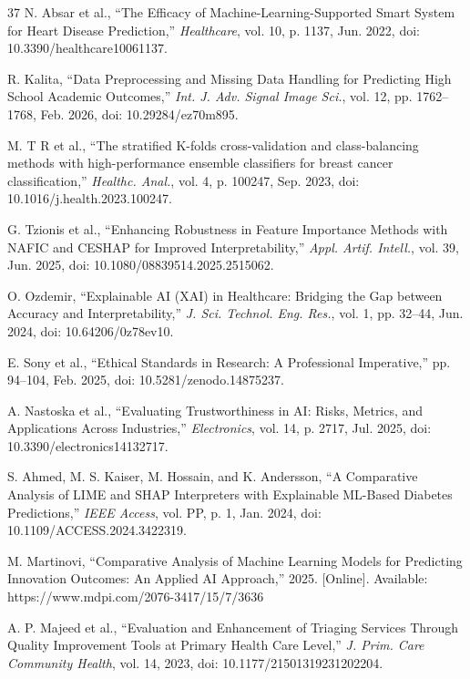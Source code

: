 \documentclass[conference]{IEEEtran}
\begin{document}
\begin{thebibliography}{37}
N. Absar et al., ``The Efficacy of Machine-Learning-Supported Smart System for Heart Disease Prediction,'' \textit{Healthcare}, vol. 10, p. 1137, Jun. 2022, doi: 10.3390/healthcare10061137.

R. Kalita, ``Data Preprocessing and Missing Data Handling for Predicting High School Academic Outcomes,'' \textit{Int. J. Adv. Signal Image Sci.}, vol. 12, pp. 1762--1768, Feb. 2026, doi: 10.29284/ez70m895.

M. T R et al., ``The stratified K-folds cross-validation and class-balancing methods with high-performance ensemble classifiers for breast cancer classification,'' \textit{Healthc. Anal.}, vol. 4, p. 100247, Sep. 2023, doi: 10.1016/j.health.2023.100247.

G. Tzionis et al., ``Enhancing Robustness in Feature Importance Methods with NAFIC and CESHAP for Improved Interpretability,'' \textit{Appl. Artif. Intell.}, vol. 39, Jun. 2025, doi: 10.1080/08839514.2025.2515062.

O. Ozdemir, ``Explainable AI (XAI) in Healthcare: Bridging the Gap between Accuracy and Interpretability,'' \textit{J. Sci. Technol. Eng. Res.}, vol. 1, pp. 32--44, Jun. 2024, doi: 10.64206/0z78ev10.

E. Sony et al., ``Ethical Standards in Research: A Professional Imperative,'' pp. 94--104, Feb. 2025, doi: 10.5281/zenodo.14875237.

A. Nastoska et al., ``Evaluating Trustworthiness in AI: Risks, Metrics, and Applications Across Industries,'' \textit{Electronics}, vol. 14, p. 2717, Jul. 2025, doi: 10.3390/electronics14132717.

S. Ahmed, M. S. Kaiser, M. Hossain, and K. Andersson, ``A Comparative Analysis of LIME and SHAP Interpreters with Explainable ML-Based Diabetes Predictions,'' \textit{IEEE Access}, vol. PP, p. 1, Jan. 2024, doi: 10.1109/ACCESS.2024.3422319.

M. Martinovi, ``Comparative Analysis of Machine Learning Models for Predicting Innovation Outcomes: An Applied AI Approach,'' 2025. [Online]. Available: https://www.mdpi.com/2076-3417/15/7/3636

A. P. Majeed et al., ``Evaluation and Enhancement of Triaging Services Through Quality Improvement Tools at Primary Health Care Level,'' \textit{J. Prim. Care Community Health}, vol. 14, 2023, doi: 10.1177/21501319231202204.


\end{thebibliography}
\end{document}
